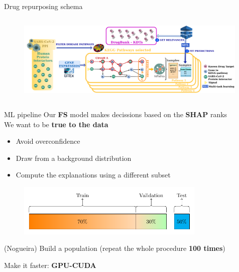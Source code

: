 \documentclass[compress,ignorenonframetext,aspectratio=1610,handout]{beamer}
\begin{document}
\begin{frame}{Drug repurposing schema}
	\begin{columns}
		\begin{figure}
			\includegraphics[width=0.99\textwidth]{figs/methods/COVI-19_drugRepo.png}
		\end{figure}

	\end{columns}
\end{frame}

\begin{frame}{ML pipeline}
		Our \textbf{FS} model makes decissions based on the \textbf{SHAP} ranks\\

		We want to be \textbf{true to the data}
		\begin{itemize}
			\item Avoid overconfidence
			\item Draw from a background distribution
			\item Compute the explanations using a different subset
		\end{itemize}

		\begin{figure}
		\centering\includegraphics[width=0.8\textwidth]{figs/methods/val.pdf}
		\end{figure}

		(Nogueira) Build a population (repeat the whole procedure \textbf{100 times})

		Make it faster: \textbf{GPU-CUDA}
\end{frame}
\end{document}
